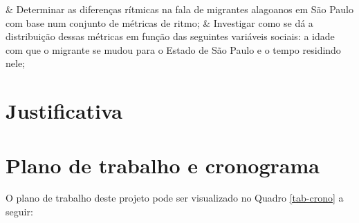 \documentclass[
		a4paper,	%
		12pt,		%
		]{article}	%
\begin{document}
	\begin{easylist}[enumerate]
		& Determinar as diferenças rítmicas na fala de migrantes alagoanos em
		São Paulo com base num conjunto de métricas de ritmo;
		& Investigar como se dá a distribuição dessas métricas em função das
		seguintes variáveis sociais: a idade com que o migrante se mudou para o
		Estado de São Paulo e o tempo residindo nele;
	\end{easylist}
	
	
	\section{Justificativa}
	

	\section{Plano de trabalho e cronograma} \label{plano}

	O plano de trabalho deste projeto pode ser visualizado no Quadro
	\ref{tab-crono} a seguir:
\end{document}
